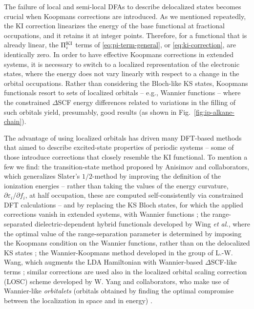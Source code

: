 The failure of local and semi-local DFAs to describe delocalized states becomes crucial when Koopmans corrections are introduced. As we mentioned repeatedly, the KI correction linearizes the energy of the base functional at fractional occupations, and it retains it at integer points. Therefore, for a functional that is already linear, the $\Pi_i^{\rm KI}$ terms of \cref{eq:pi-term-general}, or \cref{eq:ki-correction}, are identically zero. In order to have effective Koopmans corrections in extended systems, it is necessary to switch to a localized representation of the electronic states, where the energy does not vary linearly with respect to a change in the orbital occupations. Rather than considering the Bloch-like KS states, Koopmans functionals resort to sets of localized orbitals -- e.g., Wannier functions -- where the constrained $\Delta$SCF energy differences related to variations in the filling of such orbitals yield, presumably, good results (as shown in Fig.~\ref{fig:ip-alkane-chain}).

The advantage of using localized orbitals has driven many DFT-based methods that aimed to describe excited-state properties of periodic systems -- some of those introduce corrections that closely resemble the KI functional. To mention a few we find: the transition-state method proposed by Anisimov and collaborators, which generalizes Slater's $1/2$-method by improving the definition of the ionization energies -- rather than taking the values of the energy curvature, $\partial \varepsilon_i / \partial f_i$, at half occupation, these are computed self-consistently via constrained DFT calculations -- and by replacing the KS Bloch states, for which the applied corrections vanish in extended systems, with Wannier functions \cite{anisimov_transition_2005,anisimov_orbital_2007}; the range-separated dielectric-dependent hybrid functionals developed by Wing \emph{et al.}, where the optimal value of the range-separation parameter is determined by imposing the Koopmans condition on the Wannier functions, rather than on the delocalized KS states \cite{wing_band_2021}; the Wannier-Koopmans method developed in the group of L.-W. Wang, which augments the LDA Hamiltonian with Wannier-based $\Delta$SCF-like terms \cite{ma_using_2016,ma_energy_2016,weng_wannier_2017,weng_wannier_2018,li_wannier-koopmans_2018,weng_wannierkoopmans_2020}; similar corrections are used also in the localized orbital scaling correction (LOSC) scheme developed by W. Yang and collaborators, who make use of Wannier-like \emph{orbitalets} (orbitals obtained by finding the optimal compromise between the localization in space and in energy) \cite{li_localized_2018,mei_libsc_2021,mahler_wannier_2022}.


